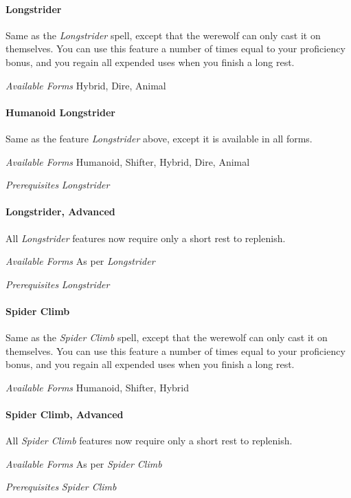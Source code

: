 \documentclass[twocolumn]{dndbook}
\begin{document}
\paragraph*{Longstrider}
Same as the \emph{Longstrider} spell, except that the werewolf can only cast it on themselves.
You can use this feature a number of times equal to your proficiency bonus, and you regain all expended uses when you finish a long rest.\par
\emph{Available Forms} Hybrid, Dire, Animal\par


\paragraph*{Humanoid Longstrider}
Same as the feature \emph{Longstrider} above, except it is available in all forms.\par
\emph{Available Forms} Humanoid, Shifter, Hybrid, Dire, Animal\par
\emph{Prerequisites} \emph{Longstrider}\par


\paragraph*{Longstrider, Advanced}
All \emph{Longstrider} features now require only a short rest to replenish.\par
\emph{Available Forms} As per \emph{Longstrider} \par
\emph{Prerequisites} \emph{Longstrider}\par

\paragraph*{Spider Climb}
Same as the \emph{Spider Climb} spell, except that the werewolf can only cast it on themselves.
You can use this feature a number of times equal to your proficiency bonus, and you regain all expended uses when you finish a long rest.\par
\emph{Available Forms} Humanoid, Shifter, Hybrid\par

\paragraph*{Spider Climb, Advanced}
All \emph{Spider Climb} features now require only a short rest to replenish.\par
\emph{Available Forms} As per \emph{Spider Climb} \par
\emph{Prerequisites} \emph{Spider Climb}\par
\end{document}
